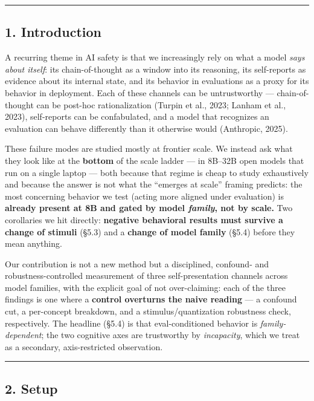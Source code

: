 \documentclass[
]{article}
\begin{document}
\begin{center}\rule{0.5\linewidth}{0.5pt}\end{center}

\subsection{1. Introduction}\label{introduction}

A recurring theme in AI safety is that we increasingly rely on what a
model \emph{says about itself}: its chain-of-thought as a window into
its reasoning, its self-reports as evidence about its internal state,
and its behavior in evaluations as a proxy for its behavior in
deployment. Each of these channels can be untrustworthy ---
chain-of-thought can be post-hoc rationalization (Turpin et al., 2023;
Lanham et al., 2023), self-reports can be confabulated, and a model that
recognizes an evaluation can behave differently than it otherwise would
(Anthropic, 2025).

These failure modes are studied mostly at frontier scale. We instead ask
what they look like at the \textbf{bottom} of the scale ladder --- in
8B--32B open models that run on a single laptop --- both because that
regime is cheap to study exhaustively and because the answer is not what
the ``emerges at scale'' framing predicts: the most concerning behavior
we test (acting more aligned under evaluation) is \textbf{already
present at 8B and gated by model \emph{family}, not by scale.} Two
corollaries we hit directly: \textbf{negative behavioral results must
survive a change of stimuli} (§5.3) and a \textbf{change of model
family} (§5.4) before they mean anything.

Our contribution is not a new method but a disciplined, confound- and
robustness-controlled measurement of three self-presentation channels
across model families, with the explicit goal of not over-claiming: each
of the three findings is one where a \textbf{control overturns the naive
reading} --- a confound cut, a per-concept breakdown, and a
stimulus/quantization robustness check, respectively. The headline
(§5.4) is that eval-conditioned behavior is \emph{family-dependent}; the
two cognitive axes are trustworthy by \emph{incapacity}, which we treat
as a secondary, axis-restricted observation.

\begin{center}\rule{0.5\linewidth}{0.5pt}\end{center}

\subsection{2. Setup}\label{setup}
\end{document}
